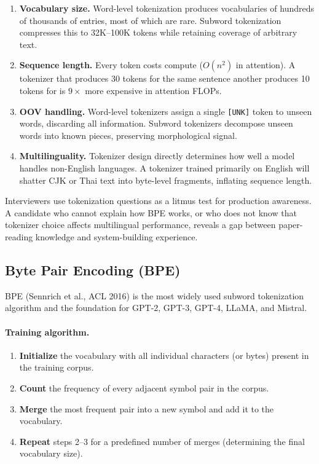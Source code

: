 \begin{enumerate}[label=\textbf{\arabic*.}]
    \item \textbf{Vocabulary size.}  Word-level tokenization produces vocabularies of
          hundreds of thousands of entries, most of which are rare.  Subword tokenization
          compresses this to 32K--100K tokens while retaining coverage of arbitrary text.
    \item \textbf{Sequence length.}  Every token costs compute ($O(n^2)$ in attention).
          A tokenizer that produces 30 tokens for the same sentence another produces 10
          tokens for is $9\times$ more expensive in attention FLOPs.
    \item \textbf{OOV handling.}  Word-level tokenizers assign a single \texttt{[UNK]}
          token to unseen words, discarding all information.  Subword tokenizers decompose
          unseen words into known pieces, preserving morphological signal.
    \item \textbf{Multilinguality.}  Tokenizer design directly determines how well a model
          handles non-English languages.  A tokenizer trained primarily on English will
          shatter CJK or Thai text into byte-level fragments, inflating sequence length.
\end{enumerate}

\begin{warningbox}
Interviewers use tokenization questions as a litmus test for production awareness.  A
candidate who cannot explain how BPE works, or who does not know that tokenizer choice
affects multilingual performance, reveals a gap between paper-reading knowledge and
system-building experience.
\end{warningbox}

\subsection{Byte Pair Encoding (BPE)}
\label{sec:bpe}

BPE (Sennrich et al., ACL 2016) is the most widely used subword tokenization algorithm
and the foundation for GPT-2, GPT-3, GPT-4, LLaMA, and Mistral.

\paragraph{Training algorithm.}
\begin{enumerate}
    \item \textbf{Initialize} the vocabulary with all individual characters (or bytes)
          present in the training corpus.
    \item \textbf{Count} the frequency of every adjacent symbol pair in the corpus.
    \item \textbf{Merge} the most frequent pair into a new symbol and add it to the
          vocabulary.
    \item \textbf{Repeat} steps 2--3 for a predefined number of merges (determining
          the final vocabulary size).
\end{enumerate}

